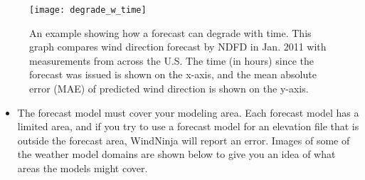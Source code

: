 \documentclass[12pt]{article}
\begin{document}
\begin{figure}[H]
	\centering
	\label{ndfd_degrade}
	\texttt{[image: degrade\_w\_time]}
	\caption*{An example showing how a forecast can degrade with time.  This graph compares wind direction forecast by NDFD in Jan. 2011 with measurements from across the U.S.  The time (in hours) since the forecast was issued is shown on the x-axis, and the mean absolute error (MAE) of predicted wind direction is shown on the y-axis.}
\end{figure}

\begin{itemize}
\item The forecast model must cover your modeling area.  Each forecast model has a limited area, and if you try to use a forecast model for an elevation file that is outside the forecast area, WindNinja will report an error.  Images of some of the weather model domains are shown below to give you an idea of what areas the models might cover.
\end{itemize}
\end{document}
